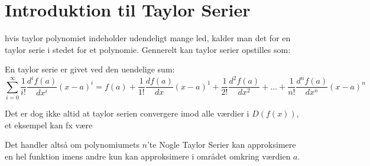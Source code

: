 \chapter{Introduktion til Taylor Serier}
hvis taylor polynomiet indeholder udendeligt mange led, 
kalder man det for en taylor serie i stedet for et polynomie. Gennerelt kan taylor serier opstilles som:
\begin{defn}
    En taylor serie er givet ved den uendelige sum:
    \[
    \sum^{\infty}_{i=0} \frac{1}{i!} \frac{d^i f(a)}{dx^i} (x-a)^{i} = f(a) + \frac{1}{1!} \frac{df(a)}{dx} (x-a)^{1} + \frac{1}{2!} \frac{d^{2}f(a)}{dx^{2}} + \ldots + \frac{1}{n!} \frac{d^{n} f(a)}{dx^{n}} (x-a)^{n}
    \]
\end{defn}
\label{def:taylorSerie}
Det er dog ikke altid at taylor serien convergere imod alle værdier i $D(f(x))$, et eksempel kan fx være 


Det handler altså om polynomiumets $n$'te 
Nogle Taylor Serier kan approksimere en hel funktion imens andre kun kan approksimere i området omkring værdien $a$.


